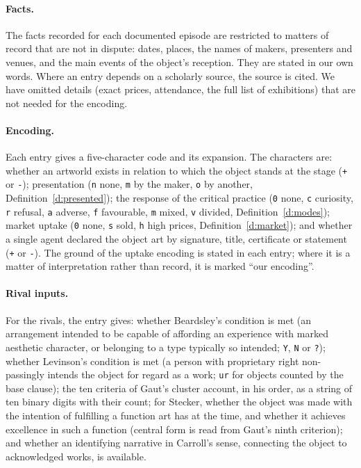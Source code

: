 \documentclass{situationist-preprint}
\begin{document}
\paragraph{Facts.} The facts recorded for each documented episode are restricted to matters of record that are not in dispute: dates, places, the names of makers, presenters and venues, and the main events of the object's reception. They are stated in our own words. Where an entry depends on a scholarly source, the source is cited. We have omitted details (exact prices, attendance, the full list of exhibitions) that are not needed for the encoding.

\paragraph{Encoding.} Each entry gives a five-character code and its expansion. The characters are: whether an artworld exists in relation to which the object stands at the stage (\texttt{+} or \texttt{-}); presentation (\texttt{n} none, \texttt{m} by the maker, \texttt{o} by another, Definition~\ref{d:presented}); the response of the critical practice (\texttt{0} none, \texttt{c} curiosity, \texttt{r} refusal, \texttt{a} adverse, \texttt{f} favourable, \texttt{m} mixed, \texttt{v} divided, Definition~\ref{d:modes}); market uptake (\texttt{0} none, \texttt{s} sold, \texttt{h} high prices, Definition~\ref{d:market}); and whether a single agent declared the object art by signature, title, certificate or statement (\texttt{+} or \texttt{-}). The ground of the uptake encoding is stated in each entry; where it is a matter of interpretation rather than record, it is marked \enquote{our encoding}.

\paragraph{Rival inputs.} For the rivals, the entry gives: whether Beardsley's condition is met (an arrangement intended to be capable of affording an experience with marked aesthetic character, or belonging to a type typically so intended; \texttt{Y}, \texttt{N} or \texttt{?}); whether Levinson's condition is met (a person with proprietary right non-passingly intends the object for regard as a work; \texttt{ur} for objects counted by the base clause); the ten criteria of Gaut's cluster account, in his order, as a string of ten binary digits with their count; for Stecker, whether the object was made with the intention of fulfilling a function art has at the time, and whether it achieves excellence in such a function (central form is read from Gaut's ninth criterion); and whether an identifying narrative in Carroll's sense, connecting the object to acknowledged works, is available.
\end{document}
